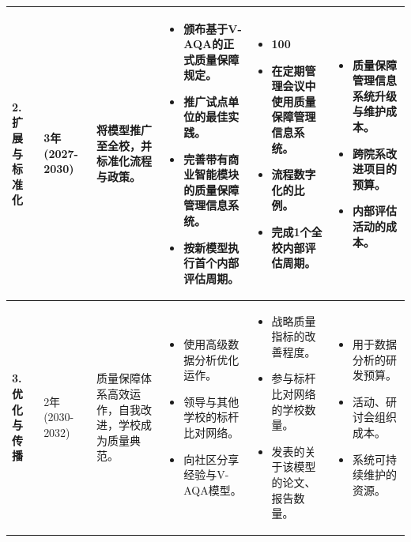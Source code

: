 \begin{longtable}{|p{1.5cm}|p{1.5cm}|p{2.8cm}|p{3.5cm}|p{3cm}|p{2cm}|}
\textbf{2. 扩展与标准化} & 3年 (2027-2030) & 将模型推广至全校，并标准化流程与政策。 &
\begin{itemize}
    \item 颁布基于V-AQA的正式质量保障规定。
    \item 推广试点单位的最佳实践。
    \item 完善带有商业智能模块的质量保障管理信息系统。
    \item 按新模型执行首个内部评估周期。
\end{itemize} &
\begin{itemize}
    \item 100%
    \item 在定期管理会议中使用质量保障管理信息系统。
    \item 流程数字化的比例。
    \item 完成1个全校内部评估周期。
\end{itemize} &
\begin{itemize}
    \item 质量保障管理信息系统升级与维护成本。
    \item 跨院系改进项目的预算。
    \item 内部评估活动的成本。
\end{itemize} \\
\hline

\textbf{3. 优化与传播} & 2年 (2030-2032) & 质量保障体系高效运作，自我改进，学校成为质量典范。 &
\begin{itemize}
    \item 使用高级数据分析优化运作。
    \item 领导与其他学校的标杆比对网络。
    \item 向社区分享经验与V-AQA模型。
\end{itemize} &
\begin{itemize}
    \item 战略质量指标的改善程度。
    \item 参与标杆比对网络的学校数量。
    \item 发表的关于该模型的论文、报告数量。
\end{itemize} &
\begin{itemize}
    \item 用于数据分析的研发预算。
    \item 活动、研讨会组织成本。
    \item 系统可持续维护的资源。
\end{itemize} \\
\end{longtable}


